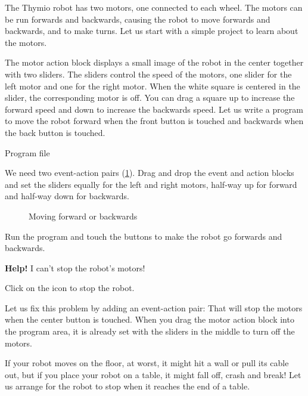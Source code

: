
\label{ch.moving}


The Thymio robot has two motors, one connected to each wheel. The
motors can be run forwards and backwards, causing the robot to move
forwards and backwards, and to make turns. Let us start with a simple
project to learn about the motors.

The motor action block  displays a small image of the
robot in the center together with two sliders. The sliders control the
speed of the motors, one slider for the left motor and one for the right
motor. When the white square is centered in the slider, the
corresponding motor is off. You can drag a square up to increase the
forward speed and down to increase the backwards speed.
Let us write a program to move the robot forward when the front button
is touched and backwards when the back button is touched.

{\raggedleft \hfill Program file }

We need two event-action pairs (\cref{fig.nostop}). Drag and drop
the event and action blocks and set the sliders equally for the left and
right motors, half-way up for forward and half-way down for backwards.

\begin{figure}
\begin{center}
\caption{Moving forward or backwards}\label{fig.nostop}
\end{center}
\end{figure}

Run the program and touch the buttons to
make the robot go forwards and backwards.

\newpage


\textbf{Help!} I can't stop the robot's motors!

Click on the icon  to stop the robot.

Let us fix this problem by adding an event-action pair: 
That will stop the motors when the center button is touched. When you
drag the motor action block into the program area, it is already set
with the sliders in the middle to turn off the motors.


If your robot moves on the floor, at worst, it might hit a wall or pull
its cable out, but if you place your robot on a table, it might fall
off, crash and break! Let us arrange for the robot to stop when it
reaches the end of a table.

